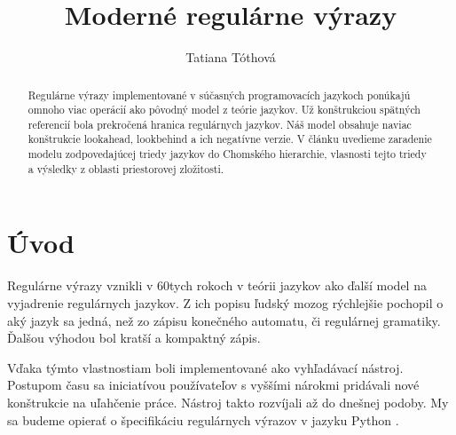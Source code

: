 \documentclass{svk_long_sk}
\begin{document}
\title{Moderné regulárne výrazy}

\author{Tatiana Tóthová
}




\maketitle

\begin{abstract}
Regulárne výrazy implementované v súčasných programovacích jazykoch ponúkajú omnoho viac operácií ako pôvodný model z teórie jazykov. Už konštrukciou spätných referencií bola prekročená hranica regulárnych jazykov. Náš model obsahuje naviac konštrukcie lookahead, lookbehind a ich negatívne verzie. V článku uvedieme zaradenie modelu zodpovedajúcej triedy jazykov do Chomského hierarchie, vlasnosti tejto triedy a výsledky z oblasti priestorovej zložitosti.

\end{abstract}

\section{Úvod}
Regulárne výrazy vznikli v 60tych rokoch v teórii jazykov ako ďalší model na vyjadrenie regulárnych jazykov. Z ich popisu ľudský mozog rýchlejšie pochopil o aký jazyk sa jedná, než zo zápisu konečného automatu, či regulárnej gramatiky. Ďalšou výhodou bol kratší a kompaktný zápis.

Vďaka týmto vlastnostiam boli implementované ako vyhľadávací nástroj. Postupom času sa iniciatívou používateľov s vyššími nárokmi pridávali nové konštrukcie na uľahčenie práce. Nástroj takto rozvíjali až do dnešnej podoby. My sa budeme opierať o špecifikáciu regulárnych výrazov v jazyku Python \cite{Python3Documentation}.
\end{document}

